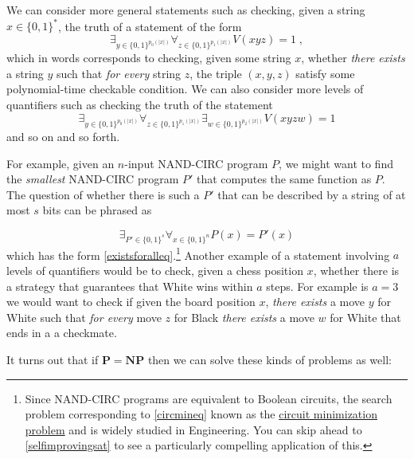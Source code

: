 We can consider more general statements such as checking, given a string
\(x\in \{0,1\}^*\), the truth of a statement of the form \[
\exists_{y \in \{0,1\}^{p_0(|x|)}} \forall_{z \in \{0,1\}^{p_1(|x|)}} V(xyz)=1 \;, \label{existsforalleq}
\] which in words corresponds to checking, given some string \(x\),
whether \emph{there exists} a string \(y\) such that \emph{for every}
string \(z\), the triple \((x,y,z)\) satisfy some polynomial-time
checkable condition. We can also consider more levels of quantifiers
such as checking the truth of the statement \[
\exists_{y \in \{0,1\}^{p_0(|x|)}} \forall_{z\in \{0,1\}^{p_1(|x|)}}\exists_{w\in \{0,1\}^{p_2(|x|)}} V(xyzw)=1 \label{existsforallexistseq}
\] and so on and so forth.

For example, given an \(n\)-input NAND-CIRC program \(P\), we might want
to find the \emph{smallest} NAND-CIRC program \(P'\) that computes the
same function as \(P\). The question of whether there is such a \(P'\)
that can be described by a string of at most \(s\) bits can be phrased
as

\[
\exists_{P' \in \{0,1\}^{s}} \forall_{x\in \{0,1\}^n} P(x)=P'(x) \label{circmineq}
\] which has the form \eqref{existsforalleq}.\footnote{Since NAND-CIRC
  programs are equivalent to Boolean circuits, the search problem
  corresponding to \eqref{circmineq} known as the
  \href{https://goo.gl/iykqbh}{circuit minimization problem} and is
  widely studied in Engineering. You can skip ahead to
  \cref{selfimprovingsat} to see a particularly compelling application
  of this.} Another example of a statement involving \(a\) levels of
quantifiers would be to check, given a chess position \(x\), whether
there is a strategy that guarantees that White wins within \(a\) steps.
For example is \(a=3\) we would want to check if given the board
position \(x\), \emph{there exists} a move \(y\) for White such that
\emph{for every} move \(z\) for Black \emph{there exists} a move \(w\)
for White that ends in a a checkmate.

It turns out that if \(\mathbf{P}=\mathbf{NP}\) then we can solve these
kinds of problems as well:

\hypertarget{PH-collapse-thm}{}

